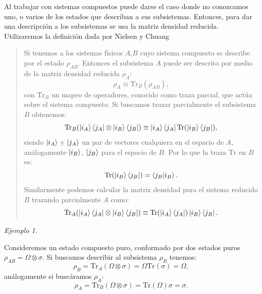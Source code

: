 \documentclass[letterpaper,12pt]{thesisECFM}
\theoremstyle{plain}
\theoremstyle{definition}
\theoremstyle{definition}
\theoremstyle{remark}
\newcommand{\1}{\mathbb{1}}
\newtheorem{ex}{Ejemplo}[section]
\begin{document}
Al trabajar con sistemas compuestos puede darse el caso donde no conozcamos
uno, o varios de los estados que describan a sus subsistemas. Entonces, para
dar una descripción a los subsistemas se usa la matriz densidad reducida.
Utilizaremos la definición dada por Nielsen y Chuang
\cite{nielsen_chuang_2011} 
\begin{quote}
    Si tenemos a los sistemas físicos $A$,$B$ cuyo sistema compuesto se describe
por el estado $\rho_{AB}$. Entonces el subsistema $A$ puede ser descrito por
medio de la matriz densidad reducida $\rho_A$:
\begin{equation}
    \rho_A \equiv \text{Tr}_B(\rho_{AB}),
\end{equation}
con $\text{Tr}_B$ un mapeo de operadores, conocido como traza parcial, que
actúa sobre el sistema compuesto. Si buscamos trazar parcialmente el subsistema
$B$ obtenemos:
\begin{equation}
    \text{Tr}_B(\ket{i_A}\bra{j_A} \otimes \ket{i_B}\bra{j_B} ) \equiv \ket{i_A} \bra{j_A} \text{Tr}(\ket{i_B}\bra{j_B}),
\end{equation}
siendo $\ket{i_A}$ y $\ket{j_A}$ un par de vectores cualquiera en el espacio de
$A$, análogamente $\ket{i_B}$, $\ket{j_B}$ para el espacio de $B$. Por lo que
la traza $\text{Tr}$ en $B$ es:
\begin{equation*}
    \text{Tr}(\ket{i_B}\bra{j_B}) = \bra{j_B}\ket{i_B}.
\end{equation*}
Similarmente podemos calcular la matriz densidad para el sistema reducido $B$
trazando parcialmente $A$ como:
\begin{equation}
    \text{Tr}_A(\ket{i_A}\bra{j_A} \otimes \ket{i_B}\bra{j_B} ) \equiv  \text{Tr}(\ket{i_A} \bra{j_A}) \ket{i_B}\bra{j_B}.
\end{equation}
\end{quote}
\begin{ex}\label{ex:traza parcial} \end{ex}  Consideremos un estado compuesto puro, conformado por dos estados puros $\rho_{AB} = \Omega  \otimes \sigma$. Si buscamos describir al subsistema $\rho_{B}$ tenemos:
\begin{equation}
    \rho_{B} = \text{Tr}_{A} (\Omega  \otimes \sigma) = \Omega \text{Tr}(\sigma) = \Omega, 
\end{equation}
análogamente si buscáramos $\rho_A$:
\begin{equation}
     \rho_{A} = \text{Tr}_{B} (\Omega  \otimes \sigma) = \text{Tr}(\Omega) \sigma = \sigma.
\end{equation}
\end{document}
